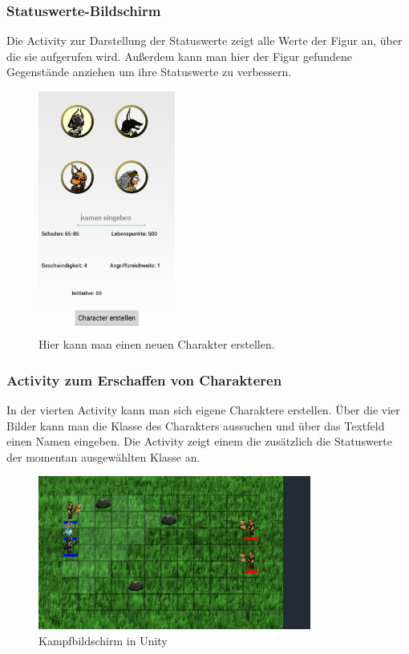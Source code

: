 \documentclass[extern,palatino]{cgBA}
\begin{document}
\subsubsection{Statuswerte-Bildschirm}
Die Activity zur Darstellung der Statuswerte zeigt alle Werte der Figur an, über die sie aufgerufen wird. Außerdem kann man hier der Figur gefundene Gegenstände anziehen um ihre Statuswerte zu verbessern.
\newpage
\begin{figure}[H] 
		\centering
		\includegraphics[width=0.4\textwidth]{createcharscreen.png}
		\caption{Hier kann man einen neuen Charakter erstellen.}
		\label{fig:Bild5}
\end{figure} 
\subsubsection{Activity zum Erschaffen von Charakteren}
In der vierten Activity kann man sich eigene Charaktere erstellen. Über die vier Bilder kann man die Klasse des Charakters aussuchen und über das Textfeld einen Namen eingeben. Die Activity zeigt einem die zusätzlich die Statuswerte der momentan ausgewählten Klasse an.
\newpage
\begin{figure}[H]
		\centering
		\includegraphics[width=0.8\textwidth]{fightscreen.png}
		\caption{Kampfbildschirm in Unity}
		\label{fightscreen}
\end{figure}
\end{document}
